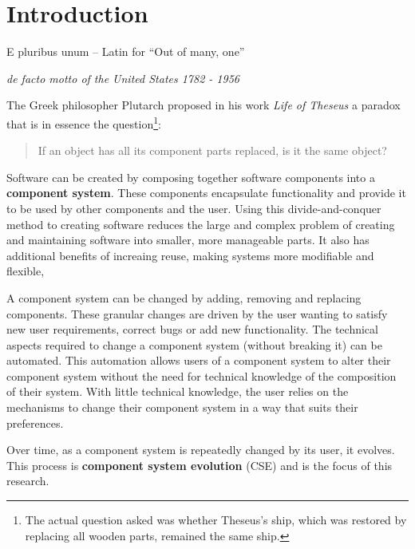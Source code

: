 \chapter{Introduction}
\label{introduction}
\epigraph{E pluribus unum -- Latin for ``Out of many, one''}
{\textit{de facto motto of the United States 1782 - 1956}}
The Greek philosopher Plutarch proposed in his work \textit{Life of Theseus} a paradox that is in essence the question\footnote{The actual question asked was whether Theseus's ship, which was restored by replacing all wooden parts, remained the same ship.}:
\begin{quote}
If an object has all its component parts replaced, is it the same object?
\end{quote}
Software can be created by composing together software components \citep{Szyperski2002} into a \textbf{component system}.
These components encapsulate functionality and provide it to be used by  other components and the user.
Using this divide-and-conquer method to creating software reduces the  large and complex problem of creating and maintaining software into smaller, more manageable parts.
It also has additional benefits of increaing reuse, making systems more modifiable and flexible, 

A component system  can be changed by adding, removing and replacing components.
These granular changes are driven by the user wanting to satisfy new user requirements, correct bugs or add new functionality. 
The technical aspects required to change a component system (without breaking it) can be automated.
This automation allows users of a component system to alter their component system without the need for technical knowledge of the composition of their system.
With little technical knowledge, the user relies on the mechanisms to change their component system in a way that suits their preferences.

Over time, as a component system is repeatedly changed by its user, it evolves.
This process is \textbf{component system evolution} (CSE) and is the focus of this research.

